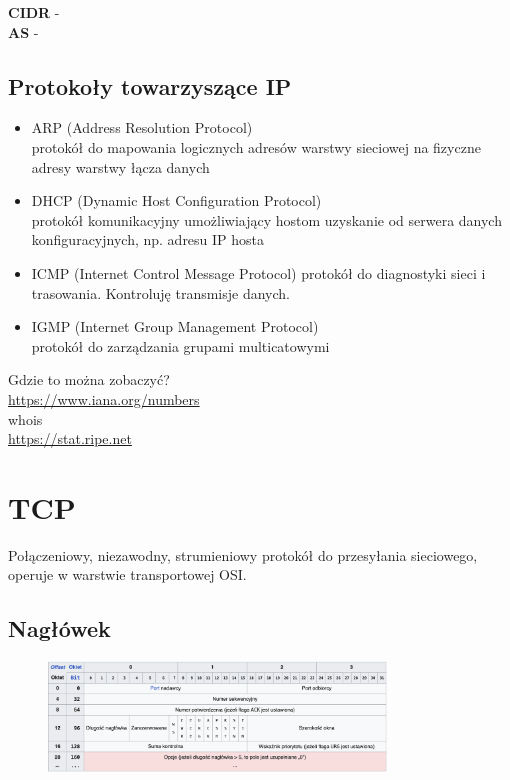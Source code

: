 \documentclass[]{article}
\begin{document}
\noindent
\textbf{CIDR} - \\
\textbf{AS} - \\

\subsection{Protokoły towarzyszące IP}
\begin{itemize}
    \item ARP (Address Resolution Protocol) \\
    protokół do mapowania logicznych adresów warstwy sieciowej na fizyczne adresy warstwy łącza danych
    \item DHCP (Dynamic Host Configuration Protocol) \\
    protokół komunikacyjny umożliwiający hostom uzyskanie od serwera danych konfiguracyjnych, np. adresu IP hosta
    \item ICMP (Internet Control Message Protocol)
    protokół do diagnostyki sieci i trasowania. Kontroluję transmisje danych.
    \item IGMP (Internet Group Management Protocol) \\
    protokół do zarządzania grupami multicatowymi

\end{itemize}
\noindent
Gdzie to można zobaczyć? \\
\href{https://www.iana.org/numbers}{https://www.iana.org/numbers} \\
whois \\
\href{https://stat.ripe.net}{https://stat.ripe.net}

\section{TCP}
Połączeniowy, niezawodny, strumieniowy protokół do przesyłania sieciowego, operuje w warstwie transportowej OSI.
\subsection{Nagłówek}
\begin{figure}[H]
    \centering
    \includegraphics[width=0.8\textwidth]{tcp.png}
\end{figure}
\end{document}
